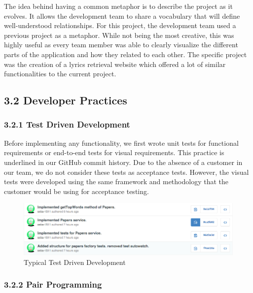 \documentclass[]{article}
\begin{document}
The idea behind having a common metaphor is to describe the project as
it evolves. It allows the development team to share a vocabulary that
will define well-understood relationships. For this project, the
development team used a previous project as a metaphor. While not being
the most creative, this was highly useful as every team member was able
to clearly visualize the different parts of the application and how they
related to each other. The specific project was the creation of a lyrics
retrieval website which offered a lot of similar functionalities to the
current project.

\subsection{3.2 Developer Practices}\label{developer-practices}

\subsubsection{3.2.1 Test Driven
Development}\label{test-driven-development}

Before implementing any functionality, we first wrote unit tests for
functional requirements or end-to-end tests for visual requirements.
This practice is underlined in our GitHub commit history. Due to the absence of a customer in our team,
we do not consider these tests as acceptance tests. However, the visual
tests were developed using the same framework and methodology that the
customer would be using for acceptance testing.

\begin{figure}[htbp]
\centering
\includegraphics{tdd_proof.png}
\caption{Typical Test Driven Development}
\end{figure}

\subsubsection{3.2.2 Pair Programming}\label{pair-programming}
\end{document}
